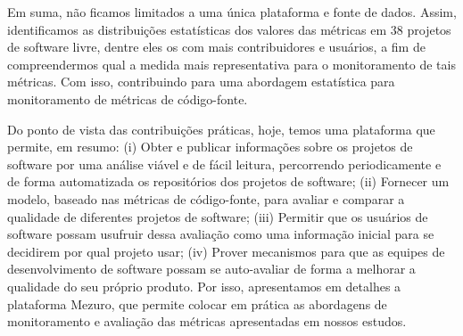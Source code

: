 \documentclass{llncs}
\begin{document}
Em suma, não ficamos limitados a uma única plataforma e fonte de dados. Assim,
identificamos as distribuições estatísticas dos valores das métricas em 38
projetos de software livre, dentre eles os com mais contribuidores e usuários,
a fim de compreendermos qual a medida mais representativa para o monitoramento
de tais métricas.
%
Com isso, contribuindo para uma abordagem estatística para monitoramento de
métricas de código-fonte.

Do ponto de vista das contribuições práticas, hoje, temos uma plataforma que
permite, em resumo: 
% 
(i) Obter e publicar informações sobre os projetos de software por uma análise
viável e de fácil leitura, percorrendo periodicamente e de forma automatizada
os repositórios dos projetos de software; 
% 
(ii) Fornecer um modelo, baseado nas métricas de código-fonte, para avaliar e
comparar a qualidade de diferentes projetos de software; 
% 
(iii) Permitir que os usuários de software possam usufruir dessa avaliação como
uma informação inicial para se decidirem por qual projeto usar; 
%
(iv) Prover mecanismos para que as equipes de desenvolvimento de software
possam se auto-avaliar de forma a melhorar a qualidade do seu próprio produto. 
%
Por isso, apresentamos em detalhes a plataforma Mezuro, que permite colocar em
prática as abordagens de monitoramento e avaliação das métricas apresentadas em
nossos estudos.




\end{document}
